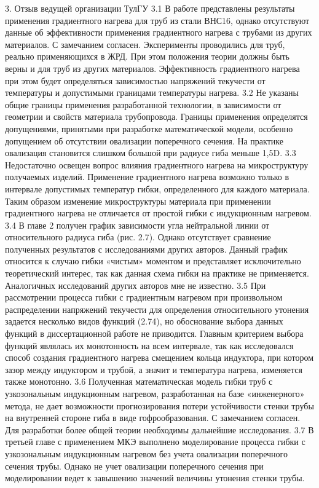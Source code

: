 3. Отзыв ведущей организации ТулГУ
3.1 В работе представлены результаты применения градиентного нагрева для труб из стали ВНС16, однако отсутствуют данные об эффективности применения градиентного нагрева с трубами из других материалов.
С замечанием согласен. Эксперименты проводились для труб, реально применяющихся в ЖРД. При этом положения теории должны быть верны и для труб из других материалов. Эффективность градиентного нагрева при этом будет определяться зависимостью напряжений текучести от температуры и допустимыми границами температуры нагрева.
3.2 Не указаны общие границы применения разработанной технологии, в зависимости от геометрии и свойств материала трубопровода.
Границы применения определятся допущениями, принятыми при разработке математической модели, особенно допущением об отсутствии овализации поперечного сечения. На практике овализация становится слишком большой при радиусе гиба меньше 1,5D.
3.3 Недостаточно освещен вопрос влияния градиентного нагрева на микроструктуру получаемых изделий.
Применение градиентного нагрева возможно только в интервале допустимых температур гибки, определенного для каждого материала. Таким образом изменение микроструктуры материала при применении градиентного нагрева не отличается от простой гибки с индукционным нагревом.
3.4 В главе 2 получен график зависимости угла нейтральной линии от относительного радиуса гиба (рис. 2.7). Однако отсутствует сравнение полученных результатов с исследованиями других авторов.
Данный график относится к случаю гибки «чистым» моментом и представляет исключительно теоретический интерес, так как данная схема гибки на практике не применяется. Аналогичных исследований других авторов мне не известно.
3.5 При рассмотрении процесса гибки с градиентным нагревом при произвольном распределении напряжений текучести для определения относительного утонения задается несколько видов функций (2.74), но обоснование выбора данных функций в диссертационной работе не приводится.
Главным критерием выбора функций являлась их монотонность на всем интервале, так как исследовался способ создания градиентного нагрева смещением кольца индуктора, при котором зазор между индуктором и трубой, а значит и температура нагрева, изменяется также монотонно.
3.6 Полученная математическая модель гибки труб с узкозональным индукционным нагревом, разработанная на базе «инженерного» метода, не дает возможности прогнозирования потери устойчивости стенки трубы на внутренней стороне гиба в виде гофрообразования.
С замечанием согласен. Для разработки более общей теории необходимы дальнейшие исследования.
3.7 В третьей главе с применением МКЭ выполнено моделирование процесса гибки с узкозональным индукционным нагревом без учета овализации поперечного сечения трубы. Однако не учет овализации поперечного сечения при моделировании ведет к завышению значений величины утонения стенки трубы.
